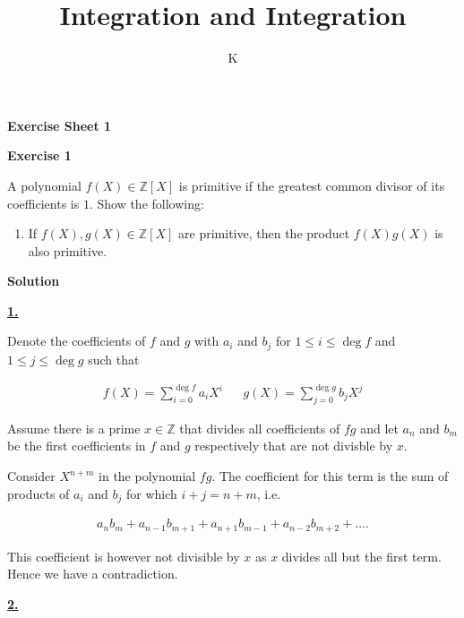 \documentclass[a4paper]{article}
\title{Integration and Integration}
\author{K}
\theoremstyle{definition}
\begin{document}
\begin{center}
    \noindent\textbf{Exercise Sheet 1}
\end{center}
\noindent\textbf{Exercise 1}

\noindent A polynomial \(f(X) \in \mathbb{Z}[X]\) is primitive if the greatest common divisor of its coefficients is \(1\). Show the following:
\begin{enumerate}
    \item If \(f(X), g(X) \in \mathbb{Z}[X]\) are primitive, then the product \(f(X)g(X)\) is also primitive.
\end{enumerate}

\noindent\textbf{Solution}

\noindent\underline{\textbf{1.}}

\noindent Denote the coefficients of \(f\) and \(g\) with \(a_i\) and \(b_j\) for \(1 \leq i \leq \deg f\) and \(1 \leq j \leq \deg g\) such that

\begin{align}
    f(X) = \sum_{i = 0}^{\deg f} a_i X^i && g(X) = \sum_{j = 0}^{\deg g} b_j X^j
\end{align}

\noindent Assume there is a prime \(x \in \mathbb{Z}\) that divides all coefficients of \(fg\) and let \(a_n\) and \(b_m\) be the first coefficients in \(f\) and \(g\) respectively that are not divisble by \(x\).

\noindent Consider \(X^{n + m}\) in the polynomial \(fg\). The coefficient for this term is the sum of products of \(a_i\) and \(b_j\) for which \(i + j = n + m\), i.e.

\begin{align}
    a_n b_m + a_{n - 1} b_{m+1} + a_{n + 1} b_{m - 1} + a_{n - 2} b_{m + 2} + \dots \text{.}
\end{align}

\noindent This coefficient is however not divisible by \(x\) as \(x\) divides all but the first term. Hence we have a contradiction.

\noindent \underline{\textbf{2.}}
\end{document}
